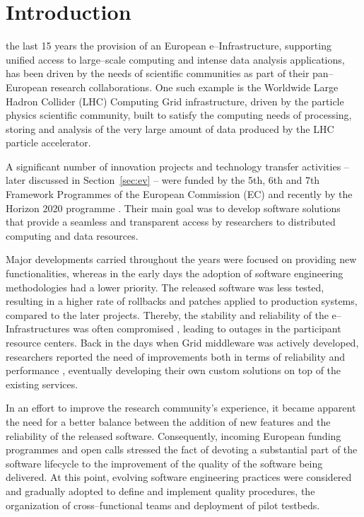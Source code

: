 \documentclass[journal]{IEEEtran}
\begin{document}
\section{Introduction}

 the last 15 years the provision of an European e--Infrastructure,
supporting unified access to large--scale computing and intense data analysis
applications, has been driven by the needs of scientific communities as part of their
pan--European research collaborations. One such example is the Worldwide
Large Hadron Collider (LHC) Computing Grid infrastructure, driven
by the particle physics scientific community, built to satisfy the computing needs
of processing, storing and analysis of the very large amount of data produced by the
LHC particle accelerator.

A significant number of innovation projects and technology transfer
activities -- later discussed in Section~\ref{sec:ev} --
were funded by the 5th, 6th and 7th Framework Programmes of the European Commission (EC)
and recently by the Horizon 2020 programme \cite{h2020}. Their main goal was to develop
software solutions that provide a seamless and transparent access by researchers to
distributed computing and data resources.

Major developments carried throughout the years were focused on providing new
functionalities, whereas in the early days the adoption of software engineering methodologies had a lower priority.
The released software was less tested, resulting in a higher rate of
rollbacks and patches applied to production systems, compared to the later projects. Thereby, the stability and
reliability of the e--Infrastructures was often compromised \cite{lingrand-egee}, leading to outages
in the participant resource centers. Back in the days when Grid middleware was actively developed, researchers
reported the need of improvements both in terms of reliability and performance \cite{campana-atlas}, eventually
developing their own custom solutions \cite{kindermann}\cite{mendez-lorenzo} on top of the existing services.

In an effort to improve the research community's experience, it became apparent the need for a better
balance between the addition of new features and the reliability of the released software. Consequently,
incoming European funding programmes and open calls stressed the fact of devoting a substantial part of the software lifecycle to the improvement of the quality of the
software being delivered. At this point, evolving software engineering practices were considered
and gradually adopted to define and implement quality procedures, the organization of
cross--functional teams and deployment of pilot testbeds.
\end{document}
